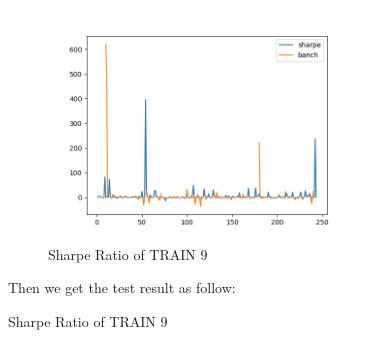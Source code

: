 \begin{figure}[H]
\begin{subfigure}{.5\textwidth}
\end{subfigure}%
\begin{subfigure}{.5\textwidth}%
\centering
\includegraphics[clip, width=0.9\textwidth]{Graphics/trainPA99s.png} \caption{Sharpe Ratio of TRAIN 9}
\end{subfigure}%
\vspace{0.7cm}

Then we get the test result as follow:


\end{figure}
